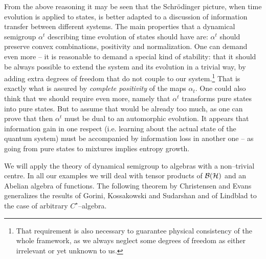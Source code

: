 \documentclass[12pt]{article}
\begin{document}
From the above reasoning it may be seen that the Schr\"odinger picture,  when
time evolution is applied to states,  is better adapted to a discussion of
information transfer between different systems.  The main properties that a
dynamical semigroup $\alpha ^t$ describing time evolution of states should
have are:  $\alpha ^t$ should preserve convex combinations,  positivity and
normalization.  One can demand even more -- it is reasonable to demand a
special kind of stability:  
that it should be always possible to extend the
system and its evolution in a trivial way,  by adding extra degrees of
freedom that do not couple to our system.\footnote{That requirement 
is also necessary to guarantee physical consistency of the whole
framework, as we always neglect some degrees of freedom as either
irrelevant or yet unknown to us.}  
That is exactly what is assured by 
{\em complete positivity} of the maps $\alpha_t. $ One could also think that
we should require even more,  namely that $\alpha ^t$ transforms pure states 
into
pure states.  But to assume that would be already too much,
as one can prove that then
$\alpha^t $ must be dual to an automorphic evolution.  
It appears that information 
gain in one respect  (i.e. learning about the actual 
state of the quantum system) 
must be accompanied by information loss in another one -- as
going from pure states to mixtures implies entropy growth. 

We will apply the theory of dynamical semigroup to algebras with a non--trivial
centre.  In all our examples we will deal with tensor products of 
${\cal B} ({\cal H})$ and an Abelian algebra of functions.  
The following theorem by Christensen and Evans \cite{chr} generalizes the
results of Gorini,  Kossakowski and Sudarshan and of Lindblad to the case of
arbitrary $C^{\star }$--algebra. 
\end{document}
